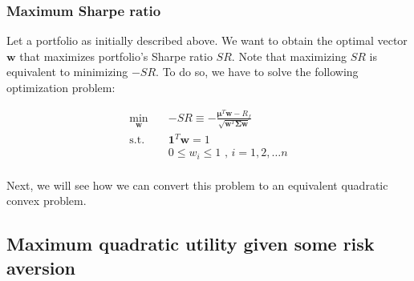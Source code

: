 \documentclass{beamer}
\begin{document}
\begin{frame}
\frametitle{\textbf{Maximum Sharpe ratio}}

\justifying
Let a portfolio as initially described above. We want to obtain the optimal vector $\mathbf{w}$ that maximizes portfolio's Sharpe ratio $SR$. Note that maximizing $SR$ is equivalent to minimizing $-SR$. To do so, we have to solve the following optimization problem:

\vspace{0.2cm}
\justifying
\begin{equation}
\begin{aligned}
\label{eq:4}
\min_{\mathbf{w}} \quad & - SR \equiv -  \frac{\boldsymbol\mu^{T} \mathbf{w} - R_{f}}{\sqrt{\mathbf{w}^{T}\mathbf{\Sigma}\mathbf{w}}} \\
\textrm{s.t.} \quad & \mathbf{1}^{T} \mathbf{w} = 1 \\
                             & 0 \leq w_{i} \leq 1 \textrm{ , } i = 1, 2, \dots n \\
\end{aligned}
\end{equation}

\vspace{0.2cm}
\justifying
Next, we will see how we can convert this problem to an equivalent quadratic convex problem. 


\end{frame}






\subsection{Maximum quadratic utility given some risk aversion}
\end{document}
